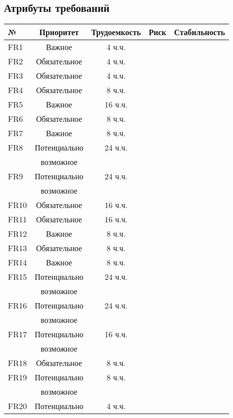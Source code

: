 \subsection{Атрибуты требований}
\begin{longtable}{|l|c|c|c|c|}
    \hline
    № & Приоритет & Трудоемкость & Риск & Стабильность \\ \hline
    \endhead
    FR1  & Важное       &  4 ч.ч. & & \\ \hline
    FR2  & Обязательное &  4 ч.ч. & & \\ \hline
    FR3  & Обязательное &  4 ч.ч. & & \\ \hline
    FR4  & Обязательное &  8 ч.ч. & & \\ \hline
    FR5  & Важное       & 16 ч.ч. & & \\ \hline
    FR6  & Обязательное &  8 ч.ч. & & \\ \hline
    FR7  & Важное       &  8 ч.ч. & & \\ \hline
    FR8  & Потенциально & 24 ч.ч. & & \\
         & возможное    &         & & \\ \hline
    FR9  & Потенциально & 24 ч.ч. & & \\
         & возможное    &         & & \\ \hline
    FR10 & Обязательное & 16 ч.ч. & & \\ \hline
    FR11 & Обязательное & 16 ч.ч. & & \\ \hline
    FR12 & Важное       &  8 ч.ч. & & \\ \hline
    FR13 & Обязательное &  8 ч.ч. & & \\ \hline
    FR14 & Важное       &  8 ч.ч. & & \\ \hline
    FR15 & Потенциально & 24 ч.ч. & & \\
         & возможное    &         & & \\ \hline
    FR16 & Потенциально & 24 ч.ч. & & \\
         & возможное    &         & & \\ \hline
    FR17 & Потенциально & 16 ч.ч. & & \\
         & возможное    &         & & \\ \hline
    FR18 & Обязательное &  8 ч.ч. & & \\ \hline
    FR19 & Потенциально &  8 ч.ч. & & \\
         & возможное    &         & & \\ \hline
    FR20 & Потенциально &  4 ч.ч. & & \\

\end{longtable}
